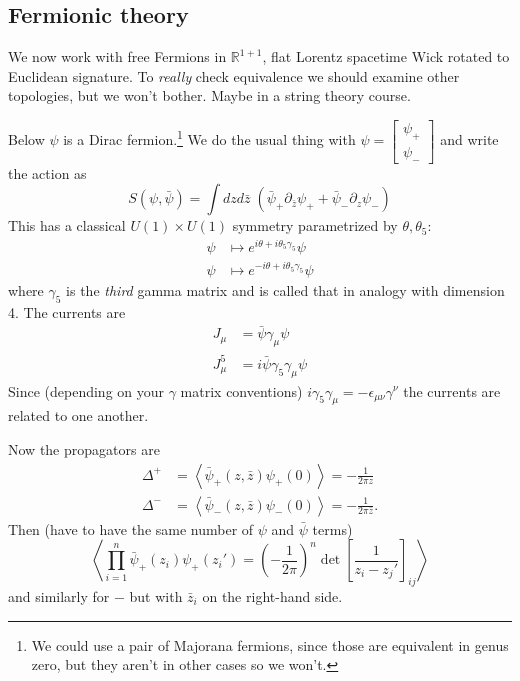 \subsection*{Fermionic theory}
We now work with free Fermions in $\mathbb{R}^{1+1}$, flat Lorentz spacetime Wick rotated to Euclidean signature.
To \emph{really} check equivalence we should examine other topologies, but we won't bother.
Maybe in a string theory course.

Below $\psi$ is a Dirac fermion.\footnote{We could use a pair of Majorana fermions, since those are equivalent in genus zero, but they aren't in other cases so we won't.}
We do the usual thing with $\psi = \begin{bmatrix} \psi_+ \\ \psi_- \end{bmatrix}$ and write the action as
\[
S(\psi, \bar \psi) = \int dz d\bar z \; \left( \bar \psi_+ \partial_{\bar z} \psi_+ + \bar \psi_- \partial_z \psi_-\right)
\]
This has a classical $U(1) \times U(1)$ symmetry parametrized by $\theta, \theta_5$:
\begin{align*}
\psi &\mapsto e^{i \theta +i \theta_5 \gamma_5} \psi\\
\psi &\mapsto e^{-i \theta +i \theta_5 \gamma_5} \psi
\end{align*}
where $\gamma_5$ is the \emph{third} gamma matrix and is called that in analogy with dimension 4.
The currents are
\begin{align*}
J_\mu &= \bar \psi \gamma_\mu \psi\\
J_\mu^5 &= i \bar \psi \gamma_5 \gamma_\mu \psi
\end{align*}
Since (depending on your $\gamma$ matrix conventions) $i \gamma_5 \gamma_\mu = - \epsilon_{\mu \nu} \gamma^\nu$ the currents are related to one another.

Now the propagators are 
\begin{align*}
\Delta^+ &= \left \langle \bar \psi _+(z,\bar z) \psi_+(0)\right \rangle = - \frac{1}{2\pi z}\\
\Delta^- &= \left \langle \bar \psi _-(z,\bar z) \psi_-(0)\right \rangle = - \frac{1}{2\pi \bar z}.
\end{align*}
Then (have to have the same number of $\psi$ and $\bar \psi$ terms)
\[
\left \langle \prod_{i=1}^n \bar \psi_+(z_i) \psi_+(z_i') = \left ( -\frac{1}{2\pi} \right)^n \det \left [ \frac{1}{z_i - z_j'}\right]_{ij} \right \rangle
\]
and similarly for $-$ but with $\bar z_i$ on the right-hand side.

